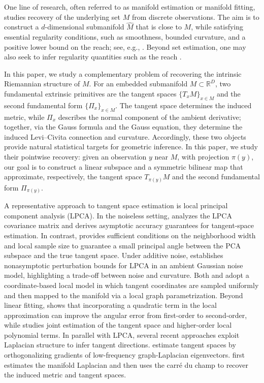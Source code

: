 \documentclass[11pt]{article}
\theoremstyle{plain}
\theoremstyle{definition}
\begin{document}
One line of research, often referred to as manifold estimation or manifold fitting, studies recovery of the underlying set $M$ from discrete observations. 
The aim is to construct a $d$-dimensional submanifold $\widehat M$ that is close to $M$, while satisfying essential regularity conditions, such as smoothness, bounded curvature, and a positive lower bound on the reach; see, e.g., \citet{Genovese2012manifold, Genovese2014Ridge, Fefferman2018FittingAP, Yao2019ManifoldFU, Sober2020, Fefferman2023LargeReach, yao2023manifold, Fefferman2023fittingmanifolddatapresence}. Beyond set estimation, one may also seek to infer regularity quantities such as the reach \citep{Aamari2019reach}.

In this paper, we study a complementary problem of recovering the intrinsic Riemannian structure of $M$.
For an embedded submanifold $M \subset \mathbb{R}^D$, two fundamental extrinsic primitives are the tangent spaces $\{T_xM\}_{x\in M}$ and the second fundamental form $\{\Pi_x\}_{x\in M}$. The tangent space determines the induced metric, while $\Pi_x$ describes the normal component of the ambient derivative; together, via the Gauss formula and the Gauss equation, they determine the induced Levi--Civita connection and curvature. Accordingly, these two objects provide natural statistical targets for geometric inference.
In this paper, we study their pointwise recovery: given an observation $y$ near $M$, with projection $\pi(y)$, our goal is to construct a linear subspace and a symmetric bilinear map that approximate, respectively, the tangent space $T_{\pi(y)}M$ and the second fundamental form $\Pi_{\pi(y)}$.

A representative approach to tangent space estimation is local principal component analysis (LPCA). In the noiseless setting, \citet{Singer2011VectorDM} analyzes the LPCA covariance matrix and derives asymptotic accuracy guarantees for tangent-space estimation. In contrast, \citet{Tyagi2012} provides sufficient conditions on the neighborhood width and local sample size to guarantee a small principal angle between the PCA subspace and the true tangent space. 
Under additive noise, \citet{Kaslovsky2014NonAsymptoticAO} establishes nonasymptotic perturbation bounds for LPCA in an ambient Gaussian noise model, highlighting a trade-off between noise and curvature. Both \citet{Tyagi2012} and \citet{Kaslovsky2014NonAsymptoticAO} adopt a coordinate-based local model in which tangent coordinates are sampled uniformly and then mapped to the manifold via a local graph parametrization.
Beyond linear fitting, \citet{Cheng2016} shows that incorporating a quadratic term in the local approximation can improve the angular error from first-order to second-order, while \citet{Aamari2017NonasymptoticRF} studies joint estimation of the tangent space and higher-order local polynomial terms. In parallel with LPCA, several recent approaches exploit Laplacian structure to infer tangent directions.
\citet{Kohli2025RobustTS} estimate tangent spaces by orthogonalizing gradients of low-frequency graph-Laplacian eigenvectors. \citet{Jones2025ManifoldDG} first estimates the manifold Laplacian and then uses the carré du champ to recover the induced metric and tangent spaces.
\end{document}
